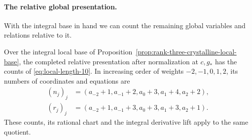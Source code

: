 \paragraph{The relative global presentation.}
With the integral base in hand we can count the remaining global variables and
relations relative to it.

\begin{lemma}
\label{lem:relative-rank-three-presentation}
Over the integral local base of Proposition~\ref{prop:rank-three-crystalline-local-base},
the completed relative presentation after normalization at
\(c,g_*\) has the counts of \eqref{eq:local-length-10}. In increasing order of
weights \(-2,-1,0,1,2\), its numbers of coordinates and equations are
\[
 \begin{aligned}
 (n_j)_j&=(a_{-2}+1,a_{-1}+2,a_0+3,a_1+4,a_2+2),\\
 (r_j)_j&=(a_{-2}+1,a_{-1}+3,a_0+3,a_1+3,a_2+1).
 \end{aligned}
\]
These counts, its rational chart and the integral derivative lift
apply to the same quotient.
\end{lemma}

